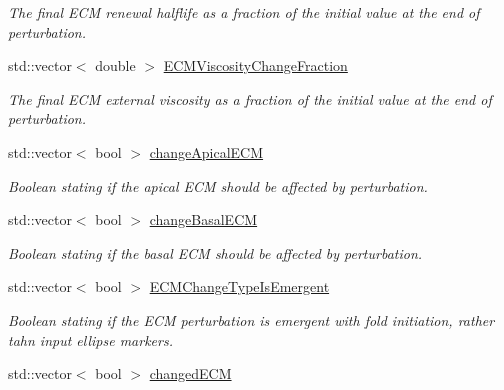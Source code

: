 \begin{DoxyCompactItemize}
\begin{DoxyCompactList}\small\item\em The final E\+C\+M renewal halflife as a fraction of the initial value at the end of perturbation. \end{DoxyCompactList}\item 
\hypertarget{classSimulation_a2367e4589f071a0925265873773cbb1d}{}std\+::vector$<$ double $>$ \hyperlink{classSimulation_a2367e4589f071a0925265873773cbb1d}{E\+C\+M\+Viscosity\+Change\+Fraction}\label{classSimulation_a2367e4589f071a0925265873773cbb1d}

\begin{DoxyCompactList}\small\item\em The final E\+C\+M external viscosity as a fraction of the initial value at the end of perturbation. \end{DoxyCompactList}\item 
\hypertarget{classSimulation_a082e87b4a29d83f54866ac085e188d92}{}std\+::vector$<$ bool $>$ \hyperlink{classSimulation_a082e87b4a29d83f54866ac085e188d92}{change\+Apical\+E\+C\+M}\label{classSimulation_a082e87b4a29d83f54866ac085e188d92}

\begin{DoxyCompactList}\small\item\em Boolean stating if the apical E\+C\+M should be affected by perturbation. \end{DoxyCompactList}\item 
\hypertarget{classSimulation_aa8c12a070e93fd1cd504f98aed28c9fa}{}std\+::vector$<$ bool $>$ \hyperlink{classSimulation_aa8c12a070e93fd1cd504f98aed28c9fa}{change\+Basal\+E\+C\+M}\label{classSimulation_aa8c12a070e93fd1cd504f98aed28c9fa}

\begin{DoxyCompactList}\small\item\em Boolean stating if the basal E\+C\+M should be affected by perturbation. \end{DoxyCompactList}\item 
\hypertarget{classSimulation_a2c668b7adc2f6d2d2d4520cc45e6926a}{}std\+::vector$<$ bool $>$ \hyperlink{classSimulation_a2c668b7adc2f6d2d2d4520cc45e6926a}{E\+C\+M\+Change\+Type\+Is\+Emergent}\label{classSimulation_a2c668b7adc2f6d2d2d4520cc45e6926a}

\begin{DoxyCompactList}\small\item\em Boolean stating if the E\+C\+M perturbation is emergent with fold initiation, rather tahn input ellipse markers. \end{DoxyCompactList}\item 
\hypertarget{classSimulation_a99017cf7137be61482cfdcbe751f7a11}{}std\+::vector$<$ bool $>$ \hyperlink{classSimulation_a99017cf7137be61482cfdcbe751f7a11}{changed\+E\+C\+M}\label{classSimulation_a99017cf7137be61482cfdcbe751f7a11}


\end{DoxyCompactItemize}
